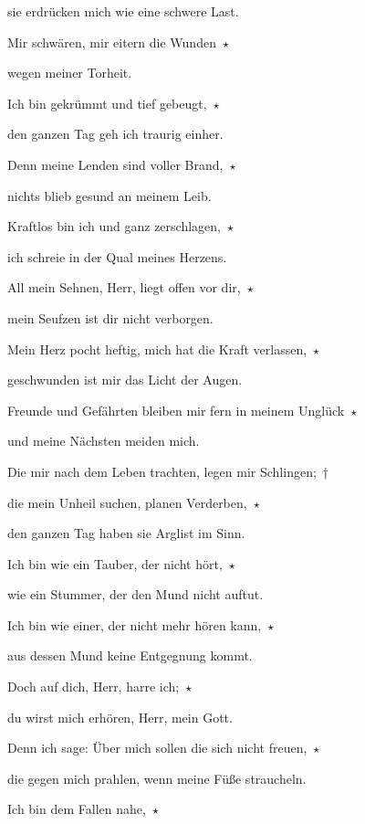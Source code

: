 sie erdrücken mich wie eine schwere Last.
 
\noindent Mir schwären, mir eitern die Wunden~$\star$~\nopagebreak

wegen meiner Torheit.
 
\noindent Ich bin gekrümmt und tief gebeugt,~$\star$~\nopagebreak

den ganzen Tag geh ich traurig einher.
 
\noindent Denn meine Lenden sind voller Brand,~$\star$~\nopagebreak

nichts blieb gesund an meinem Leib.
 
\noindent Kraftlos bin ich und ganz zerschlagen,~$\star$~\nopagebreak

ich schreie in der Qual meines Herzens.
 
\noindent All mein Sehnen, Herr, liegt offen vor dir,~$\star$~\nopagebreak

mein Seufzen ist dir nicht verborgen.
 
\noindent Mein Herz pocht heftig, mich hat die Kraft verlassen,~$\star$~\nopagebreak

geschwunden ist mir das Licht der Augen.
 
\noindent Freunde und Gefährten bleiben mir fern in meinem Unglück~$\star$~\nopagebreak

und meine Nächsten meiden mich.
 
\noindent Die mir nach dem Leben trachten, legen mir Schlingen;~†~\nopagebreak

die mein Unheil suchen, planen Verderben,~$\star$~\nopagebreak

den ganzen Tag haben sie Arglist im Sinn.
 
\noindent Ich bin wie ein Tauber, der nicht hört,~$\star$~\nopagebreak

wie ein Stummer, der den Mund nicht auftut.
 
\noindent Ich bin wie einer, der nicht mehr hören kann,~$\star$~\nopagebreak

aus dessen Mund keine Entgegnung kommt.
 
\noindent Doch auf dich, Herr, harre ich;~$\star$~\nopagebreak

du wirst mich erhören, Herr, mein Gott.
 
\noindent Denn ich sage: Über mich sollen die sich nicht freuen,~$\star$~\nopagebreak

die gegen mich prahlen, wenn meine Füße straucheln.
 
\noindent Ich bin dem Fallen nahe,~$\star$~\nopagebreak


